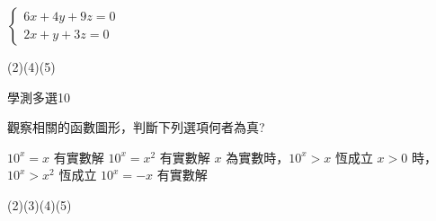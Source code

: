 \begin{QUESTIONS}
\begin{QUESTION}
\begin{QBODY}
\begin{QOPS}
                \QOP
                $\left\{ \begin{array}{l} 6x+4y+9z=0 \\ 2x+y+3z =0 \end{array}\right.$
            \end{QOPS}
        \end{QBODY}
        \begin{QFROMS}
        \end{QFROMS}
        \begin{QTAGS}\end{QTAGS}
        \begin{QANS}
            (2)(4)(5)
        \end{QANS}
        \begin{QSOLLIST}
        \end{QSOLLIST}
        \begin{QEMPTYSPACE}
        \end{QEMPTYSPACE}
    \end{QUESTION}
    \begin{QUESTION}
        \begin{ExamInfo}{91}{學測}{多選}{10}
        \end{ExamInfo}
        \begin{ExamAnsRateInfo}{20}{40}{11}{9}
        \end{ExamAnsRateInfo}
        \begin{QBODY}
            觀察相關的函數圖形，判斷下列選項何者為真?
            \begin{QOPS}
                \QOP $10^x=x$ 有實數解 
                \QOP $10^x=x^2$ 有實數解 
                \QOP $x$ 為實數時，$10^x>x$ 恆成立 
                \QOP $x>0$ 時，$10^x>x^2$ 恆成立 
                \QOP $10^x= -x$ 有實數解
            \end{QOPS}
        \end{QBODY}
        \begin{QFROMS}
        \end{QFROMS}
        \begin{QTAGS}\end{QTAGS}
        \begin{QANS}
            (2)(3)(4)(5)
        \end{QANS}
        \begin{QSOLLIST}
        \end{QSOLLIST}
        \begin{QEMPTYSPACE}

\end{QEMPTYSPACE}
\end{QUESTION}
\end{QUESTIONS}
